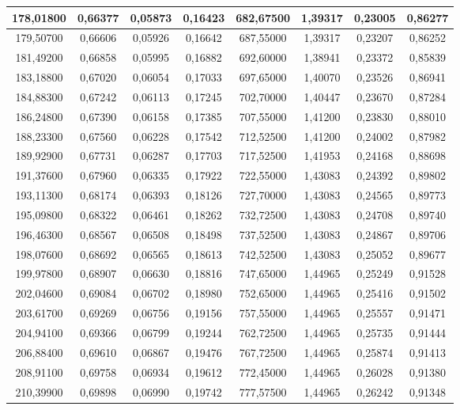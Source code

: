 \documentclass[a4paper,12pt]{article}
\numberwithin{equation}{section}
\begin{document}
\begin{appendices}
\begin{longtable}[c]{|c|c|c|c|c|c|c|c|}
178,01800	&	0,66377	&	0,05873	&	0,16423	&	682,67500	&	1,39317	&	0,23005	&	0,86277	\\\hline
179,50700	&	0,66606	&	0,05926	&	0,16642	&	687,55000	&	1,39317	&	0,23207	&	0,86252	\\\hline
181,49200	&	0,66858	&	0,05995	&	0,16882	&	692,60000	&	1,38941	&	0,23372	&	0,85839	\\\hline
183,18800	&	0,67020	&	0,06054	&	0,17033	&	697,65000	&	1,40070	&	0,23526	&	0,86941	\\\hline
184,88300	&	0,67242	&	0,06113	&	0,17245	&	702,70000	&	1,40447	&	0,23670	&	0,87284	\\\hline
186,24800	&	0,67390	&	0,06158	&	0,17385	&	707,55000	&	1,41200	&	0,23830	&	0,88010	\\\hline
188,23300	&	0,67560	&	0,06228	&	0,17542	&	712,52500	&	1,41200	&	0,24002	&	0,87982	\\\hline
189,92900	&	0,67731	&	0,06287	&	0,17703	&	717,52500	&	1,41953	&	0,24168	&	0,88698	\\\hline
191,37600	&	0,67960	&	0,06335	&	0,17922	&	722,55000	&	1,43083	&	0,24392	&	0,89802	\\\hline
193,11300	&	0,68174	&	0,06393	&	0,18126	&	727,70000	&	1,43083	&	0,24565	&	0,89773	\\\hline
195,09800	&	0,68322	&	0,06461	&	0,18262	&	732,72500	&	1,43083	&	0,24708	&	0,89740	\\\hline
196,46300	&	0,68567	&	0,06508	&	0,18498	&	737,52500	&	1,43083	&	0,24867	&	0,89706	\\\hline
198,07600	&	0,68692	&	0,06565	&	0,18613	&	742,52500	&	1,43083	&	0,25052	&	0,89677	\\\hline
199,97800	&	0,68907	&	0,06630	&	0,18816	&	747,65000	&	1,44965	&	0,25249	&	0,91528	\\\hline
202,04600	&	0,69084	&	0,06702	&	0,18980	&	752,65000	&	1,44965	&	0,25416	&	0,91502	\\\hline
203,61700	&	0,69269	&	0,06756	&	0,19156	&	757,55000	&	1,44965	&	0,25557	&	0,91471	\\\hline
204,94100	&	0,69366	&	0,06799	&	0,19244	&	762,72500	&	1,44965	&	0,25735	&	0,91444	\\\hline
206,88400	&	0,69610	&	0,06867	&	0,19476	&	767,72500	&	1,44965	&	0,25874	&	0,91413	\\\hline
208,91100	&	0,69758	&	0,06934	&	0,19612	&	772,45000	&	1,44965	&	0,26028	&	0,91380	\\\hline
210,39900	&	0,69898	&	0,06990	&	0,19742	&	777,57500	&	1,44965	&	0,26242	&	0,91348	\\\hline

\end{longtable}
\end{appendices}
\end{document}
